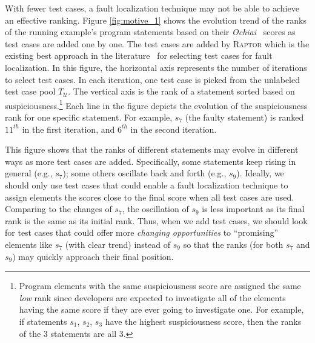 With fewer test cases, a fault localization technique may not be able to achieve an effective ranking. Figure \ref{fig:motive_1} shows the evolution trend of the ranks of the running example's program statements based on their {\em Ochiai}~\citep{Abreu:2009.jss} scores as test cases are added one by one. The test cases are added by \textsc{Raptor} which is the existing best approach in the literature~\citep{Alberto2011} for selecting test cases for fault localization. In this figure, the horizontal axis represents the number of iterations to select test cases. In each iteration, one test case is picked from the unlabeled test case pool $T_\mathcal{U}$.
The vertical axis is the rank
of a statement sorted based on suspiciousness.\footnote{\scriptsize Program elements with the same suspiciousness score are assigned the same {\em low} rank since developers are expected to investigate all of the elements having the same score if they are ever going to investigate one. For example, if statements $s_{1}$, $s_{2}$, $s_{3}$ have the highest suspiciousness score, then the ranks of the 3 statements are all 3.} Each line in the figure depicts the evolution of the suspiciousness rank for one specific statement. For example, $s_{7}$ (the faulty statement) is ranked $11^{th}$ in the first iteration, and $6^{th}$ in the second iteration.

This figure shows that the ranks of different statements may evolve in different ways as more test cases are added. Specifically, some statements keep rising in general (e.g., $s_{7}$); some others oscillate back and forth (e.g., $s_{9}$).
Ideally, we should only use test cases that could enable a fault localization technique to assign elements the scores close to the final score when all test cases are used.
Comparing to the changes of $s_{7}$, the oscillation of $s_{9}$ is less important as its final rank is the same as its initial rank.
Thus, when we add test cases, we should look for test cases that could offer more {\em changing opportunities} to ``promising'' elements like $s_{7}$ (with clear trend) instead of $s_{9}$ so that the ranks (for both $s_{7}$ and $s_{9}$) may quickly approach their final position.

